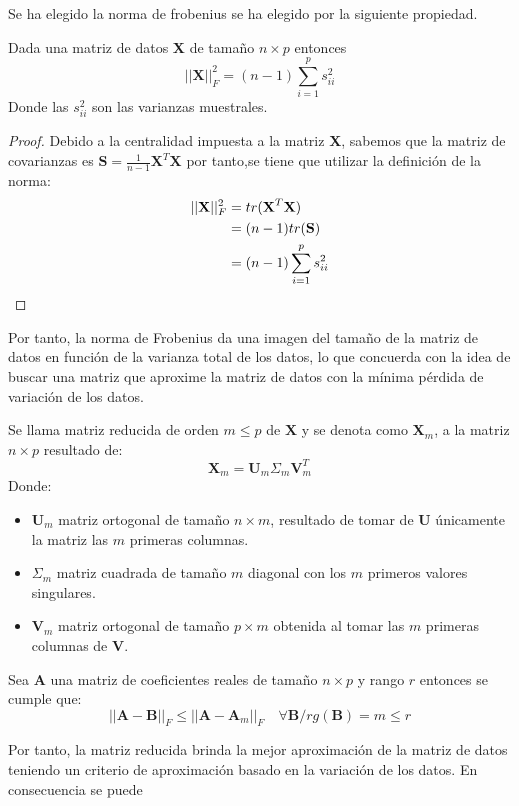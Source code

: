 \noindent Se ha elegido la norma de frobenius se ha elegido por la siguiente propiedad. 
\begin{propo}
Dada una matriz de datos \textbf{X} de tamaño $n\times p$ entonces
\begin{equation}
||\textbf{X}||_F^2=(n-1)\sum_{i=1}^p s_{ii}^2
\end{equation}
Donde las $s_{ii}^2$ son las varianzas muestrales.
\begin{proof}
Debido a la centralidad impuesta a la matriz \textbf{X}, sabemos que la matriz de covarianzas es $\textbf{S}=\frac{1}{n-1}\textbf{X}^T \textbf{X}$ por tanto,se tiene que utilizar la definición de la norma:
\begin{align*}
||\textbf{X}||_F^2 &= tr(\textbf{X}^T\textbf{X})\\
&= (n-1) tr(\textbf{S})\\
&= (n-1) \sum_{i=1}^p s_{ii}^2 \qedhere
\end{align*}
\end{proof}
\end{propo}
\noindent Por tanto, la norma de Frobenius da una imagen del tamaño de la matriz de datos en función de la varianza total de los datos, lo que concuerda con la idea de buscar una matriz que aproxime la matriz de datos con la mínima pérdida de variación de los datos.  
\begin{defi}
Se llama matriz reducida de orden $m\leq p$ de $\textbf{X}$ y se denota como $\textbf{X}_m$, a la matriz $n\times p$ resultado de:
\begin{equation}
\textbf{X}_m=\textbf{U}_m\Sigma_m\textbf{V}^T_m
\end{equation}
Donde:
\begin{itemize}
\item $\textbf{U}_m$ matriz ortogonal de tamaño $n \times m$, resultado de tomar de \textbf{U} únicamente la matriz las $m$ primeras columnas. 
\item $\Sigma_m$  matriz cuadrada de tamaño $m$ diagonal con los $m$ primeros valores singulares. 
\item $\textbf{V}_m$ matriz ortogonal de tamaño $p \times m$ obtenida al tomar las $m$ primeras columnas de \textbf{V}.
\end{itemize}
\end{defi}

\begin{teorema}
Sea \textbf{A} una matriz de coeficientes reales de tamaño $n\times p$ y rango $r$  entonces se cumple que:
\begin{equation}
||\textbf{A}-\textbf{B}||_F\leq ||\textbf{A}-\textbf{A}_m||_F \quad \forall \textbf{B}/ rg(\textbf{B})=m \leq r
\end{equation} 
\end{teorema}

\noindent Por tanto, la matriz reducida brinda la mejor aproximación de la matriz de datos teniendo un criterio de aproximación basado en la variación de los datos. En consecuencia se puede 